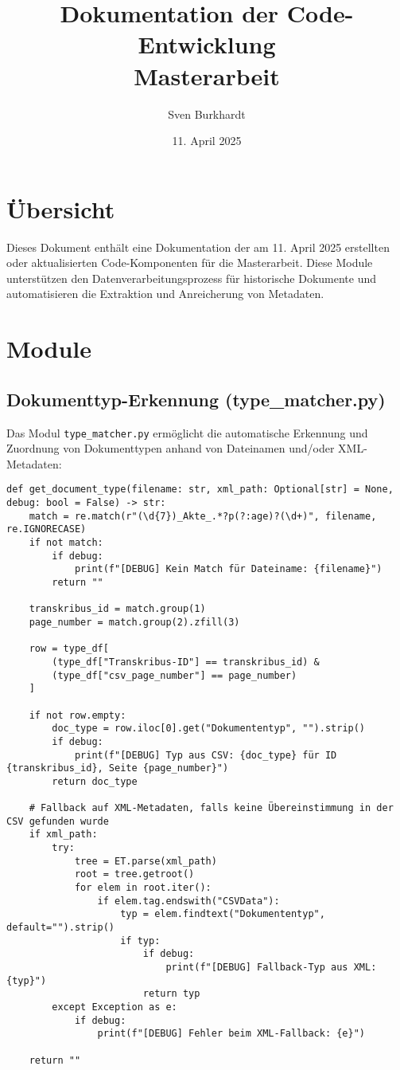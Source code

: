\documentclass{article}
\title{Dokumentation der Code-Entwicklung\\Masterarbeit}
\author{Sven Burkhardt}
\date{11. April 2025}
\begin{document}
\maketitle

\section{Übersicht}
Dieses Dokument enthält eine Dokumentation der am 11. April 2025 erstellten oder aktualisierten Code-Komponenten für die Masterarbeit. Diese Module unterstützen den Datenverarbeitungsprozess für historische Dokumente und automatisieren die Extraktion und Anreicherung von Metadaten.

\section{Module}

\subsection{Dokumenttyp-Erkennung (type\_matcher.py)}
Das Modul \texttt{type\_matcher.py} ermöglicht die automatische Erkennung und Zuordnung von Dokumenttypen anhand von Dateinamen und/oder XML-Metadaten:

\begin{tcolorbox}[title=Dokumenttyp-Erkennung]
\begin{lstlisting}[style=pythonstyle]
def get_document_type(filename: str, xml_path: Optional[str] = None, debug: bool = False) -> str:
    match = re.match(r"(\d{7})_Akte_.*?p(?:age)?(\d+)", filename, re.IGNORECASE)
    if not match:
        if debug:
            print(f"[DEBUG] Kein Match für Dateiname: {filename}")
        return ""

    transkribus_id = match.group(1)
    page_number = match.group(2).zfill(3)

    row = type_df[
        (type_df["Transkribus-ID"] == transkribus_id) &
        (type_df["csv_page_number"] == page_number)
    ]

    if not row.empty:
        doc_type = row.iloc[0].get("Dokumententyp", "").strip()
        if debug:
            print(f"[DEBUG] Typ aus CSV: {doc_type} für ID {transkribus_id}, Seite {page_number}")
        return doc_type

    # Fallback auf XML-Metadaten, falls keine Übereinstimmung in der CSV gefunden wurde
    if xml_path:
        try:
            tree = ET.parse(xml_path)
            root = tree.getroot()
            for elem in root.iter():
                if elem.tag.endswith("CSVData"):
                    typ = elem.findtext("Dokumententyp", default="").strip()
                    if typ:
                        if debug:
                            print(f"[DEBUG] Fallback-Typ aus XML: {typ}")
                        return typ
        except Exception as e:
            if debug:
                print(f"[DEBUG] Fehler beim XML-Fallback: {e}")

    return ""
\end{lstlisting}
\end{tcolorbox}
\end{document}
